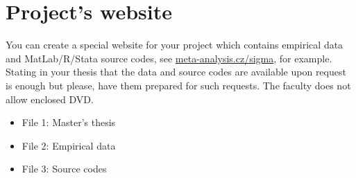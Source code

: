\chapter{Project's website}

You can create a special website for your project which contains empirical data and MatLab/R/Stata source codes, see \href{http://meta-analysis.cz/sigma/}{meta-analysis.cz/sigma}, for example.
Stating in your thesis that the data and source codes are available upon request is enough but please, have them prepared for such requests. The faculty does not allow enclosed DVD.

\begin{itemize}
		\item File 1: Master's thesis
    \item File 2: Empirical data    
		\item File 3: Source codes
\end{itemize}
